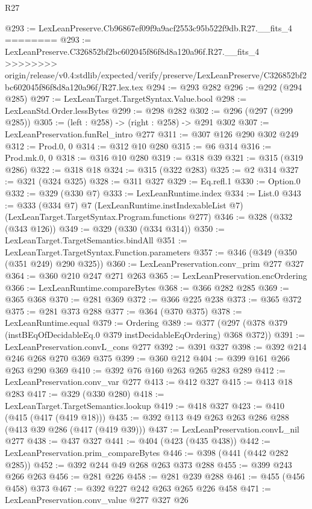\begin{lexlean}{R27}
\begin{coremodule}
{{{{{{{{{{{@293 := LexLeanPreserve.Cb96867ef09f9a9acf2553c95b522f9db.R27.__fits_4
========
@293 := LexLeanPreserve.C326852bf2bc602045f86f8d8a120a96f.R27.__fits_4
>>>>>>>> origin/release/v0.4:stdlib/expected/verify/preserve/LexLeanPreserve/C326852bf2bc602045f86f8d8a120a96f/R27.lex.tex
@294 := @293 @282
@296 := @292 (@294 @285)
@297 := LexLeanTarget.TargetSyntax.Value.bool
@298 := LexLeanStd.Order.lessBytes
@299 := @298 @282
@302 := @296 (@297 (@299 @285))
@305 := (left : @258) -> (right : @258) -> @291 @302
@307 := LexLeanPreservation.funRel_intro @277
@311 := @307 @126 @290 @302 @249
@312 := Prod.{0, 0}
@314 := @312 @10 @280
@315 := @6 @314
@316 := Prod.mk.{0, 0}
@318 := @316 @10 @280
@319 := @318 @39
@321 := @315 (@319 @286)
@322 := @318 @18
@324 := @315 (@322 @283)
@325 := @2 @314
@327 := @321 (@324 @325)
@328 := @311 @327
@329 := Eq.refl.{1}
@330 := Option.{0}
@332 := @329 (@330 @7)
@333 := LexLeanRuntime.index
@334 := List.{0}
@343 := @333
    (@334 @7)
    @7
    (LexLeanRuntime.instIndexableList @7)
    (LexLeanTarget.TargetSyntax.Program.functions @277)
@346 := @328 (@332 (@343 @126))
@349 := @329 (@330 (@334 @314))
@350 := LexLeanTarget.TargetSemantics.bindAll
@351 := LexLeanTarget.TargetSyntax.Function.parameters
@357 := @346 (@349 (@350 (@351 @249) @290 @325))
@360 := LexLeanPreservation.conv_prim @277 @327
@364 := @360 @210 @247 @271 @263
@365 := LexLeanPreservation.encOrdering
@366 := LexLeanRuntime.compareBytes
@368 := @366 @282 @285
@369 := @365 @368
@370 := @281 @369
@372 := @366 @225 @238
@373 := @365 @372
@375 := @281 @373 @288
@377 := @364 (@370 @375)
@378 := LexLeanRuntime.equal
@379 := Ordering
@389 := @377 (@297 (@378 @379 (instBEqOfDecidableEq.{0} @379 instDecidableEqOrdering) @368 @372))
@391 := LexLeanPreservation.convL_cons @277
@392 := @391 @327
@398 := @392 @214 @246 @268 @270 @369 @375
@399 := @360 @212
@404 := @399 @161 @266 @263 @290 @369
@410 := @392 @76 @160 @263 @265 @283 @289
@412 := LexLeanPreservation.conv_var @277
@413 := @412 @327
@415 := @413 @18 @283
@417 := @329 (@330 @280)
@418 := LexLeanTarget.TargetSemantics.lookup
@419 := @418 @327
@423 := @410 (@415 (@417 (@419 @18)))
@435 := @392 @113 @49 @263 @263 @286 @288 (@413 @39 @286 (@417 (@419 @39)))
@437 := LexLeanPreservation.convL_nil @277
@438 := @437 @327
@441 := @404 (@423 (@435 @438))
@442 := LexLeanPreservation.prim_compareBytes
@446 := @398 (@441 (@442 @282 @285))
@452 := @392 @244 @49 @268 @263 @373 @288
@455 := @399 @243 @266 @263
@456 := @281 @226
@458 := @281 @239 @288
@461 := @455 (@456 @458) @373
@467 := @392 @227 @242 @263 @265 @226 @458
@471 := LexLeanPreservation.conv_value @277 @327 @26
}}}}}}}}}}}
\end{coremodule}
\end{lexlean}
